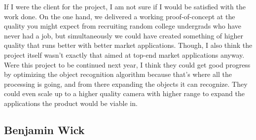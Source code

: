 \documentclass[onecolumn, draftclsnofoot,10pt, compsoc]{IEEEtran}
\begin{document}
If I were the client for the project, I am not sure if I would be satisfied with the work done. On the one hand, we delivered a working proof-of-concept at the quality you might expect from recruiting random college undergrads who have never had a job, but simultaneously we could have created something of higher quality that runs better with better market applications. Though, I also think the project itself wasn't exactly that aimed at top-end market applications anyway.
\newline
Were this project to be continued next year, I think they could get good progress by optimizing the object recognition algorithm because that's where all the processing is going, and from there expanding the objects it can recognize. They could even scale up to a higher quality camera with higher range to expand the applications the product would be viable in.


\subsection{Benjamin Wick}
\end{document}
